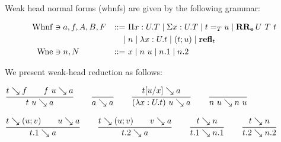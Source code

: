 \documentclass[a4paper,english]{lipics-utf8x}
\begin{document}

Weak head normal forms (whnfs) are given by the following grammar:

\begin{align*}
  \operatorname{Whnf} &\ni a,f,A,B,F &::=~& \Pi x:U.T \mid \Sigma x:U.T \mid t =_T u
                         \mid \operatorname{\mathbf{RR_e}}U\ T\ t \\
      &&\mid~& n \mid \lambda x:U.t \mid (t;u) \mid \operatorname{\mathbf{refl}}_t \\
  \operatorname{Wne}  &\ni n,N &::=~& x \mid n~u \mid n.1 \mid n.2
\end{align*}

We present weak-head reduction as follows:

\begin{center}
\(
  \ru{t \rew f \qquad
      f~u \rew a
    }{t~u \rew a}
  \qquad
  \ru{}{a \rew a}
  \qquad
  \ru{t[u/x] \rew a
    }{(\lambda x:U.t)~u \rew a}
  \qquad
  \ru{}{n~u \rew n~u}
\)
\end{center}

\begin{center}
\(
  \ru{t \rew (u;v) \qquad
      u \rew a
    }{t.1 \rew a}
  \qquad
  \ru{t \rew (u;v) \qquad
      v \rew a
    }{t.2 \rew a}
  \qquad
  \ru{t \rew n
    }{t.1 \rew n.1}
  \qquad
  \ru{t \rew n
    }{t.2 \rew n.2}
\)
\end{center}
\end{document}
